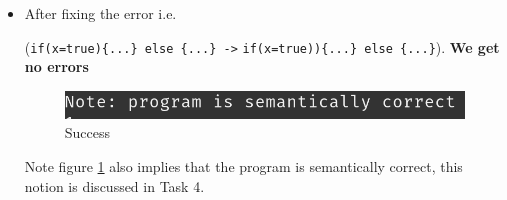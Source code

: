 \begin{itemize}
	\item After fixing the error i.e.
	          
	      (\verb!if(x=true){...} else {...} ->! \verb!if(x=true)){...} else {...}!).  \textbf{We get no errors}
	      \begin{figure}[H]
	      	\centering
	      	\includegraphics[scale=0.9]{Task2/image/pass.png}
	      	\caption{Success}
	      	\label{fig:succes parse test}
	      \end{figure}
	      Note figure \ref{fig:succes parse test} also implies that the program is semantically correct, this notion is discussed in Task 4.
\end{itemize}